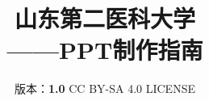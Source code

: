 

\title{%
    {\Huge\textbf{山东第二医科大学\\[5pt]——PPT制作指南}}%
}
\author{%
    版本：\textbf{1.0} \qquad%
    CC BY-SA 4.0 LICENSE \qquad%
    }
\date{\CurrentCustomTime}
\maketitle

\renewcommand{\thefootnote}{\arabic{footnote}}
